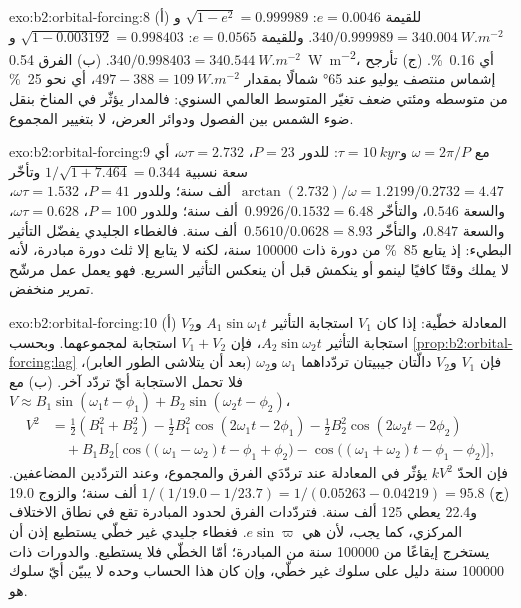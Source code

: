 \begin{solution}{exo:b2:orbital-forcing:8}
(أ) للقيمة $e = 0.0046$: $\sqrt{1 - e^2} = 0.999989$ و$340/0.999989 = \qty{340.004}{W.m^{-2}}$. وللقيمة
$e = 0.0565$: $\sqrt{1 - 0.003192} = 0.998403$ و$340/0.998403 = \qty{340.544}{W.m^{-2}}$. (ب)
الفرق \qty{0.54}{W.m^{-2}}، أي \qty{0.16}{\percent}. (ج) تأرجح إشماس منتصف يوليو عند \ang{65} شمالًا
بمقدار $497 - 388 = \qty{109}{W.m^{-2}}$، أي نحو \qty{25}{\percent} من متوسطه ومئتي
ضعف تغيّر المتوسط العالمي السنوي: فالمدار يؤثّر في المناخ بنقل ضوء الشمس بين
الفصول ودوائر العرض، لا بتغيير المجموع.
\end{solution}

\begin{solution}{exo:b2:orbital-forcing:9}
مع $\omega = 2\pi/P$ و$\tau = \qty{10}{kyr}$: للدور $P = 23$، $\omega\tau = 2.732$، أي سعة
نسبية $1/\sqrt{1 + 7.464} = 0.344$ وتأخّر $\arctan(2.732)/\omega = 1.2199/0.2732 = 4.47$~ألف سنة؛
وللدور $P = 41$، $\omega\tau = 1.532$، والسعة $0.546$، والتأخّر $0.9926/0.1532 = 6.48$~ألف سنة؛ وللدور $P =
100$، $\omega\tau = 0.628$، والسعة $0.847$، والتأخّر $0.5610/0.0628 = 8.93$~ألف سنة. فالغطاء الجليدي
يفضّل التأثير البطيء: إذ يتابع \qty{85}{\percent} من دورة ذات \num{100000} سنة، لكنه لا يتابع إلا
ثلث دورة مبادرة، لأنه لا يملك وقتًا كافيًا لينمو أو ينكمش قبل أن ينعكس
التأثير السريع. فهو يعمل عمل مرشّح تمرير منخفض.
\end{solution}

\begin{solution}{exo:b2:orbital-forcing:10}
(أ) المعادلة خطّية: إذا كان $V_1$ استجابة التأثير $A_1\sin\omega_1t$ و$V_2$ استجابة التأثير
$A_2\sin\omega_2t$، فإن $V_1 + V_2$ استجابة لمجموعهما. وبحسب \cref{prop:b2:orbital-forcing:lag} فإن $V_1$
و$V_2$ دالّتان جيبيتان تردّداهما $\omega_1$ و$\omega_2$ (بعد أن يتلاشى الطور العابر)، فلا
تحمل الاستجابة أيّ تردّد آخر. (ب) مع $V \approx B_1\sin(\omega_1t - \phi_1) +
B_2\sin(\omega_2t - \phi_2)$،
\[
\begin{aligned}
  V^2 &= \tfrac12(B_1^2 + B_2^2) - \tfrac12B_1^2\cos(2\omega_1t - 2\phi_1) -
  \tfrac12B_2^2\cos(2\omega_2t - 2\phi_2)\\
  &\quad + B_1B_2\bigl[\cos\bigl((\omega_1 - \omega_2)t - \phi_1 + \phi_2\bigr) -
  \cos\bigl((\omega_1 + \omega_2)t - \phi_1 - \phi_2\bigr)\bigr],
\end{aligned}
\]
فإن الحدّ $kV^2$ يؤثّر في المعادلة عند تردّدَي الفرق والمجموع، وعند التردّدين
المضاعفين. (ج) $1/(1/19.0 - 1/23.7) = 1/(0.05263 - 0.04219) = 95.8$ ألف سنة؛ والزوج 19.0
و22.4 يعطي 125 ألف سنة. فتردّدات الفرق لحدود المبادرة تقع في
نطاق الاختلاف المركزي، كما يجب، لأن  هي $e\sin\varpi$. فغطاء جليدي غير خطّي
يستطيع إذن أن يستخرج إيقاعًا من \num{100000} سنة من المبادرة؛ أمّا الخطّي فلا
يستطيع. والدورات ذات \num{100000} سنة دليل على سلوك غير خطّي، وإن كان هذا الحساب
وحده لا يبيّن أيّ سلوك هو.
\end{solution}

